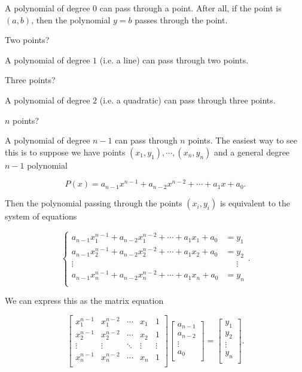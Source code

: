 \documentclass[../key.tex]{subfiles}
\begin{document}
A polynomial of degree $0$ can pass through a point. After all, if the point is $(a,b)$, then the polynomial $y=b$ passes through the point.

\begin{iinner_problem}
\item Two points?
\end{iinner_problem}

A polynomial of degree $1$ (i.e. a line) can pass through two points.

\begin{iinner_problem}
\item Three points?
\end{iinner_problem}

A polynomial of degree $2$ (i.e. a quadratic) can pass through three points.

\begin{iinner_problem}
\item $n$ points?
\end{iinner_problem}

A polynomial of degree $n-1$ can pass through $n$ points. The easiest way to see this is to suppose we have points $(x_1,y_1), \cdots, (x_n,y_n)$ and a general degree $n-1$ polynomial

$$P(x)=a_{n-1}x^{n-1}+a_{n-2}x^{n-2}+\cdots+a_1x+a_0.$$

Then the polynomial passing through the points $(x_i,y_i)$ is equivalent to the system of equations

$$\left\{\begin{aligned}
a_{n-1}x_1^{n-1}+a_{n-2}x_1^{n-2}+\cdots+a_1x_1+a_0 &= y_1 \\
a_{n-1}x_2^{n-1}+a_{n-2}x_2^{n-2}+\cdots+a_1x_2+a_0 &= y_2 \\
\vdots &\phantom{=} \vdots \\
a_{n-1}x_n^{n-1}+a_{n-2}x_n^{n-2}+\cdots+a_1x_n+a_0 &= y_n \\
\end{aligned}\right..$$

We can express this as the matrix equation

$$\begin{bmatrix}
x_1^{n-1} & x_1^{n-2} & \cdots & x_1 & 1 \\
x_2^{n-1} & x_2^{n-2} & \cdots & x_2 & 1 \\
\vdots & \vdots & \ddots & \vdots & \vdots \\
x_n^{n-1} & x_n^{n-2} & \cdots & x_n & 1 \\
\end{bmatrix}\begin{bmatrix}
a_{n-1} \\ a_{n-2} \\ \vdots \\ a_0 \\
\end{bmatrix} = \begin{bmatrix}
y_1 \\ y_2 \\ \vdots \\ y_n \\
\end{bmatrix}.$$
\end{document}
